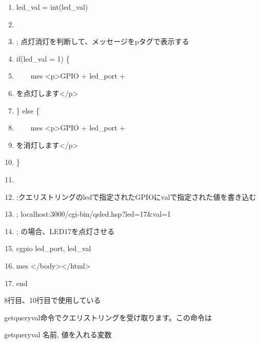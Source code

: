 \documentclass[a4paper,12pt,dvipdfmx]{jarticle}
\begin{document}
\begin{boxedminipage}{16.538cm}
\begin{enumerate}
	\item led\_val = int(led\_val)


	\item

	\item; 点灯消灯を判断して、メッセージをpタグで表示する

	\item if(led\_val = 1) \{

	\item\ \ \ \ mes {\textquotedbl}{\textless}p{\textgreater}GPIO{\textquotedbl} + led\_port +
	\item{\textquotedbl}を点灯します{\textless}/p{\textgreater}{\textquotedbl}

	\item\} else \{

	\item\ \ \ \ mes {\textquotedbl}{\textless}p{\textgreater}GPIO{\textquotedbl} + led\_port +
	\item{\textquotedbl}を消灯します{\textless}/p{\textgreater}{\textquotedbl}

	\item\}


	\item

	\item;クエリストリングのledで指定されたGPIOにvalで指定された値を書き込む

	\item; localhost:3000/cgi-bin/qsled.hsp?led=17\&val=1

	\item; の場合、LED17を点灯させる

	\item cgpio led\_port, led\_val

	\item mes {\textquotedbl}{\textless}/body{\textgreater}{\textless}/html{\textgreater}{\textquotedbl}

	\item end
	\end{enumerate}
\end{boxedminipage}
\flushleft

\bigskip



\bigskip


\bigskip

8行目、10行目で使用している

getqueryval命令でクエリストリングを受け取ります。この命令は

getqueryval 名前, 値を入れる変数
\end{document}
